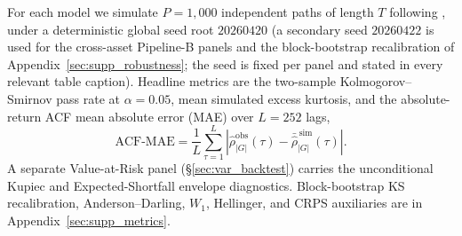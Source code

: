 For each model we simulate $P = 1{,}000$ independent paths of length $T$ following \cite{stenger2024thinking}, under a deterministic global seed root $20260420$ (a secondary seed $20260422$ is used for the cross-asset Pipeline-B panels and the block-bootstrap recalibration of Appendix~\ref{sec:supp_robustness}; the seed is fixed per panel and stated in every relevant table caption). Headline metrics are the two-sample Kolmogorov--Smirnov \cite{kolmogorov1933, smirnov1948} pass rate at $\alpha = 0.05$, mean simulated excess kurtosis, and the absolute-return ACF mean absolute error (MAE) over $L = 252$ lags,
\begin{equation}
    \text{ACF-MAE} = \frac{1}{L}\sum_{\tau=1}^{L} \left| \hat\rho^{\text{obs}}_{|G|}(\tau) - \bar{\hat\rho}^{\,\text{sim}}_{|G|}(\tau) \right|.
    \label{eq:acf_mae}
\end{equation}
A separate Value-at-Risk panel (\S\ref{sec:var_backtest}) carries the unconditional Kupiec \cite{kupiec1995techniques} and Expected-Shortfall envelope diagnostics. Block-bootstrap KS recalibration, Anderson--Darling, $W_1$, Hellinger, and CRPS auxiliaries are in Appendix~\ref{sec:supp_metrics}.
